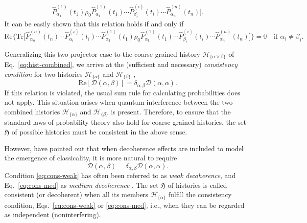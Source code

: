 \documentclass[rmp,aps,amsmath,amsfonts,noshowkeys,noshowpacs,12pt]{revtex4}
\begin{document}
\begin{widetext}
\begin{equation}
\begin{split}
\widehat{P}^{(1)}_{\alpha_1}(t_1) \rho_0 \nonumber 
\widehat{P}^{(1)}_{\alpha_1}(t_1) \cdots \widehat{P}^{(i)}_{\beta_i}(t_i) \cdots
\widehat{P}^{(n)}_{\alpha_n}(t_n) \big].
%
\end{split}
\end{equation}
%
It can be easily shown that this relation holds if and only if
%
\begin{equation}
%
\text{Re} \big\{ \text{Tr} \big[
\widehat{P}^{(n)}_{\alpha_n}(t_n) 
\cdots \widehat{P}^{(i)}_{\alpha_i}(t_i) \cdots 
\widehat{P}^{(1)}_{\alpha_1}(t_1) \rho_0 
\widehat{P}^{(1)}_{\alpha_1}(t_1) \cdots \widehat{P}^{(i)}_{\beta_i}(t_i) \cdots
\widehat{P}^{(n)}_{\alpha_n}(t_n)  \big] \big\} = 0 \quad \text{if $\alpha_i \not= \beta_i$}.
%
\end{equation}
%
\end{widetext}
%
\noindent Generalizing this two-projector case to the coarse-grained history
$\mathcal{H}_{\{\alpha \lor \beta\}}$ of Eq.~\eqref{eq:hist-combined},
we arrive at the (sufficient and necessary) {\em consistency condition}
for two histories $\mathcal{H}_{\{\alpha\}}$ and
$\mathcal{H}_{\{\beta\}}$
\citep{Griffiths:1984:tr,Omnes:1990:ww,Omnes:1992:gy},
%
\begin{equation} \label{eq:cons-weak}
\text{Re}[\mathcal{D}(\alpha,\beta)] = \delta_{\alpha,\beta}
\mathcal{D}(\alpha,\alpha).
\end{equation}
%
If this relation is violated, the usual sum rule for calculating
probabilities does not apply. This situation arises when quantum
interference between the two combined histories
$\mathcal{H}_{\{\alpha\}}$ and $\mathcal{H}_{\{\beta\}}$ is present.
Therefore, to ensure that the standard laws of probability theory also
hold for coarse-grained histories, the set $\mathfrak{H}$ of possible
histories must be consistent in the above sense.

However, \citet{GellMann:1990:uz} have pointed out that when
decoherence effects are included to model the emergence of
classicality, it is more natural to require
%
\begin{equation} \label{eq:cons-med}
\mathcal{D}(\alpha,\beta) = \delta_{\alpha,\beta}
\mathcal{D}(\alpha,\alpha).
\end{equation}
%
Condition \eqref{eq:cons-weak} has often been referred to as {\em weak
  decoherence}, and Eq.~\eqref{eq:cons-med} as {\em medium
  decoherence} \citep[for a proposal of a criterion for {\em strong
  decoherence}, see][]{GellMann:1998:xy}. The set $\mathfrak{H}$ of
histories is called consistent (or decoherent) when all its members
$\mathcal{H}_{\{\alpha\}}$ fulfill the consistency condition,
Eqs.~\eqref{eq:cons-weak} or \eqref{eq:cons-med}, i.e., when they can
be regarded as independent (noninterfering).
\end{document}
